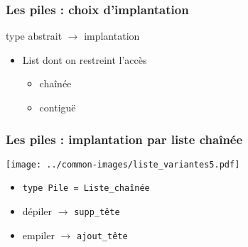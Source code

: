 \documentclass[table,handout,tikz,12pt,svgnames]{beamer}
\begin{document}
\begin{frame}[fragile=singleslide]
	\frametitle{Les piles : choix d'implantation}
	\begin{block}{type abstrait $\rightarrow$ implantation}
		\begin{itemize}
			\item List dont on restreint l'accès
			\begin{itemize}
				\item chaînée
				\item contiguë
			\end{itemize}
		\end{itemize}
	\end{block}
\end{frame}


\begin{frame}[fragile=singleslide]
	\frametitle{Les piles : implantation par liste chaînée}
			\begin{center}
				\hspace{-0.83cm}
				{\texttt{[image: ../common-images/liste\_variantes5.pdf]}}
			\end{center}
	\begin{block}{}
		\begin{itemize}
			\item  \texttt{type Pile = Liste\_chaînée}
			\vspace{1em}
			\item[] {dépiler} $\longrightarrow$ \texttt{supp\_tête}
			\item[] {empiler} $\longrightarrow$ \texttt{ajout\_tête}
		\end{itemize}
	\end{block}
\end{frame}
\end{document}
